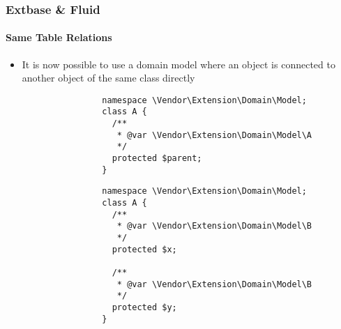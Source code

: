 \begin{frame}[fragile]
	\frametitle{Extbase \& Fluid}
	\framesubtitle{Same Table Relations}

	\lstset{basicstyle=\tiny\ttfamily}

	\begin{itemize}

		\item It is now possible to use a domain model where an object is connected
			to another object of the same class directly

			\begin{lstlisting}
				namespace \Vendor\Extension\Domain\Model;
				class A {
				  /**
				   * @var \Vendor\Extension\Domain\Model\A
				   */
				  protected $parent;
				}
			\end{lstlisting}

			\begin{lstlisting}
				namespace \Vendor\Extension\Domain\Model;
				class A {
				  /**
				   * @var \Vendor\Extension\Domain\Model\B
				   */
				  protected $x;

				  /**
				   * @var \Vendor\Extension\Domain\Model\B
				   */
				  protected $y;
				}
			\end{lstlisting}

	\end{itemize}

\end{frame}



